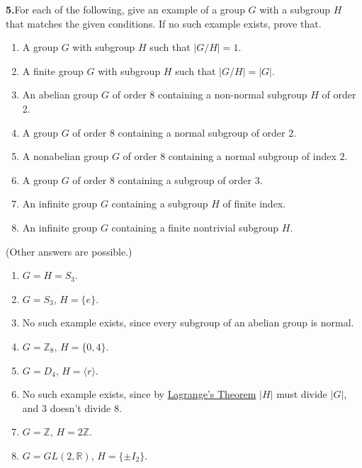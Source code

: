 \documentclass[10pt,]{book}
\theoremstyle{plain}
\theoremstyle{definition}
\theoremstyle{definition}
\theoremstyle{definition}
\theoremstyle{definition}
\numberwithin{equation}{section}
\def\Z{\mathbb{Z}}
\def\R{\mathbb{R}}
\begin{document}
\par\smallskip
\noindent\textbf{5.}\quad{}For each of the following, give an example of a group \(G\) with a subgroup \(H\) that matches the given conditions. If no such example exists, prove that. \leavevmode%
\begin{enumerate}[label=(\alph*)]
\item\hypertarget{li-448}{}A group \(G\) with subgroup \(H\) such that \(|G/H|=1\).%
\item\hypertarget{li-449}{}A finite group \(G\) with subgroup \(H\) such that \(|G/H|=|G|\).%
\item\hypertarget{li-450}{}An abelian group \(G\) of order \(8\) containing a non-normal subgroup \(H\) of order 2.%
\item\hypertarget{li-451}{}A group \(G\) of order 8 containing a normal subgroup of order \(2\).%
\item\hypertarget{li-452}{}A nonabelian group \(G\) of order 8 containing a normal subgroup of index \(2\).%
\item\hypertarget{li-453}{}A group \(G\) of order 8 containing a subgroup of order \(3\).%
\item\hypertarget{li-454}{}An infinite group \(G\) containing a subgroup \(H\) of finite index.%
\item\hypertarget{li-455}{}An infinite group \(G\) containing a finite nontrivial subgroup \(H\).%
\end{enumerate}
%
\par\smallskip
(Other answers are possible.) \leavevmode%
\begin{enumerate}[label=(\alph*)]
\item\hypertarget{li-456}{}\(G=H=S_3\).%
\item\hypertarget{li-457}{}\(G=S_3\), \(H=\{e\}\).%
\item\hypertarget{li-458}{}No such example exists, since every subgroup of an abelian group is normal.%
\item\hypertarget{li-459}{}\(G=\Z_8\), \(H=\{0,4\}\).%
\item\hypertarget{li-460}{}\(G=D_4\), \(H=\langle r\rangle\).%
\item\hypertarget{li-461}{}No such example exists, since by \hyperref[lagrange]{Lagrange's Theorem} \(|H|\) must divide \(|G|\), and 3 doesn't divide 8.%
\item\hypertarget{li-462}{}\(G=\Z\), \(H=2\Z\).%
\item\hypertarget{li-463}{}\(G=GL(2,\R)\), \(H=\{\pm I_2\}\).%
\end{enumerate}
\end{document}
